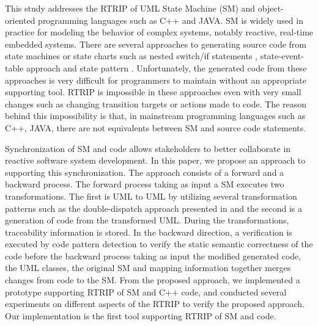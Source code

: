 This study addresses the RTRIP of UML State Machine (SM) and object-oriented programming languages such as C++ and JAVA. SM is widely used in practice for modeling the behavior of complex systems, notably reactive, real-time embedded systems. There are several approaches to generating source code from state machines or state charts such as nested switch/if statements \cite{Booch1998}, state-event-table \cite{Douglass1999, Duby2001} approach and state pattern \cite{Allegrini2002,Shalyto2006,Douglass1999}. Unfortunately, the generated code from these approaches is very difficult for programmers to maintain without an appropriate supporting tool. RTRIP is impossible in these approaches even with very small changes such as changing transition targets or actions made to code. The reason behind this impossibility is that, in mainstream programming languages such as C++, JAVA, there are not equivalents between SM and source code statements.

Synchronization of SM and code allows stakeholders to better collaborate in reactive software system development. In this paper, we propose an approach to supporting this synchronization. The approach consists of a forward and a backward process. The forward process taking as input a SM executes two transformations. The first is UML to UML by utilizing several transformation patterns such as the double-dispatch approach presented in \cite{spinke_object-oriented_2013} and the second is a generation of code from the transformed UML. During the transformations, traceability information is stored. In the backward direction, a verification is executed by code pattern detection to verify the static semantic correctness of the code before the backward process taking as input the modified generated code, the UML classes, the original SM and mapping information together merges changes from code to the SM. From the proposed approach, we implemented a prototype supporting RTRIP of SM and C++ code, and conducted several experiments on different aspects of the RTRIP to verify the proposed approach. Our implementation is the first tool supporting RTRIP of SM and code. 

